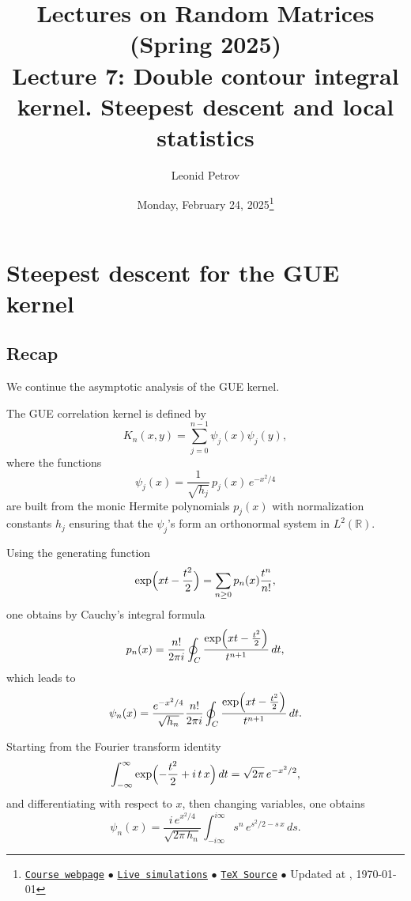 \documentclass[letterpaper,11pt,oneside,reqno]{article}
\numberwithin{equation}{section}
\theoremstyle{definition}
\begin{document}
\title{Lectures on Random Matrices
(Spring 2025)
\\Lecture 7: Double contour integral kernel. Steepest descent and local statistics}


\date{Monday, February 24, 2025\footnote{\href{https://lpetrov.cc/rmt25/}{\texttt{Course webpage}}
$\bullet$ \href{https://lpetrov.cc/simulations/model/random-matrices/}{\texttt{Live simulations}}
$\bullet$ \href{https://lpetrov.cc/rmt25/rmt25-notes/rmt2025-l07.tex}{\texttt{TeX Source}}
$\bullet$
Updated at \currenttime, \today}}



\author{Leonid Petrov}


\maketitle
\tableofcontents


\section{Steepest descent for the GUE kernel}
\label{sec:steepest-descent-GUE}

\subsection{Recap}

We continue the asymptotic analysis of the GUE kernel. 

The GUE correlation kernel is defined by
\[
K_n(x,y)=\sum_{j=0}^{n-1}\psi_j(x)\psi_j(y),
\]
where the functions
\[
\psi_j(x)=\frac{1}{\sqrt{h_j}}\,p_j(x)\,e^{-x^2/4}
\]
are built from the monic Hermite polynomials \(p_j(x)\) with normalization constants \(h_j\) ensuring that the \(\psi_j\)'s form an orthonormal system in \(L^2(\mathbb{R})\).

Using the generating function
\[
\exp\Bigl(xt-\frac{t^2}{2}\Bigr)=\sum_{n\ge0}p_n(x)\frac{t^n}{n!},
\]
one obtains by Cauchy’s integral formula
\[
p_n(x)=\frac{n!}{2\pi i}\oint_C\frac{\exp\Bigl(xt-\frac{t^2}{2}\Bigr)}{t^{n+1}}\,dt,
\]
which leads to
\[
\psi_n(x)=\frac{e^{-x^2/4}}{\sqrt{h_n}}\frac{n!}{2\pi i}\oint_C\frac{\exp\Bigl(xt-\frac{t^2}{2}\Bigr)}{t^{n+1}}\,dt.
\]

Starting from the Fourier transform identity
\[
\int_{-\infty}^{\infty} \exp\Bigl(-\frac{t^2}{2}+i\,t\,x\Bigr)\,dt
=\sqrt{2\pi}\,e^{-x^2/2},
\]
and differentiating with respect to \(x\), then changing variables, one obtains
\[
\psi_n(x)=\frac{i\,e^{x^2/4}}{\sqrt{2\pi\,h_n}}
\int_{-i\infty}^{i\infty} s^n\,e^{s^2/2- s\,x}\,ds.
\]
\end{document}
